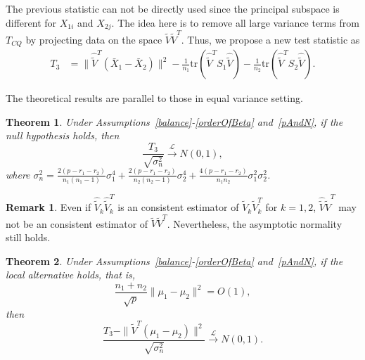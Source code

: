 \documentclass[review]{elsarticle}
\theoremstyle{plain}
\newtheorem{theorem}{\quad\quad Theorem}
\theoremstyle{definition}
\newtheorem{remark}{\quad\quad Remark}
\theoremstyle{remark}
\begin{document}
The previous statistic can not be directly used
since the principal subspace is different for $X_{1i}$ and $X_{2j}$. The idea here is to remove all large variance terms from $T_{CQ}$ by projecting data on the space $\tilde{V}\tilde{V}^T$. Thus, we propose a new test statistic as
\begin{equation*}
\begin{aligned}
    T_3&=\|\hat{\tilde{V}}^T(\bar{X}_1-\bar{X}_2)\|^2-\frac{1}{n_1}\mathrm{tr}(\hat{\tilde{V}}^T S_1\hat{\tilde{V}})-\frac{1}{n_2}\mathrm{tr}(\hat{\tilde{V}}^T S_2\hat{\tilde{V}}).
\end{aligned}
\end{equation*}


The theoretical results are parallel to those in equal variance setting.


\begin{theorem}\label{myXiaopanpan}
    Under Assumptions~\ref{balance}-\ref{orderOfBeta} and~\ref{pAndN},
     if the null hypothesis holds, then 
\begin{equation*}
    \frac{T_3}{\sqrt{\sigma_n^2}}\xrightarrow{\mathcal{L}}N(0,1),
\end{equation*}
where
$\sigma_n^2=\frac{2(p-r_1-r_2)}{n_1(n_1-1)}\sigma_1^4+\frac{2(p-r_1-r_2)}{n_2(n_2-1)}\sigma_2^4+\frac{4(p-r_1-r_2)}{n_1n_2}\sigma_1^2\sigma_2^2$.
\end{theorem}
\begin{remark}
    Even if $\hat{\tilde{V}}_k\hat{\tilde{V}}_k^T$ is an consistent estimator of $\tilde{V}_k\tilde{V}_k^T$ for $k=1,2$, $\hat{\tilde{V}}\hat{\tilde{V}}^T$ may not be an consistent estimator of $\tilde{V}\tilde{V}^T$.
    Nevertheless, the asymptotic normality still holds.
\end{remark}
\begin{theorem}\label{myXiaopanpan2}
    Under Assumptions~\ref{balance}-\ref{orderOfBeta} and~\ref{pAndN},
 if the local alternative holds, that is,
    $$\frac{n_1+n_2}{\sqrt{p}}\|\mu_1-\mu_2\|^2=O(1),$$
then 
\begin{equation*}
        \frac{T_3-\|\tilde{V}^T(\mu_1-\mu_2)\|^2}{\sqrt{\sigma_n^2}}\xrightarrow{\mathcal{L}} N(0,1).
\end{equation*}
\end{theorem} 
\end{document}
